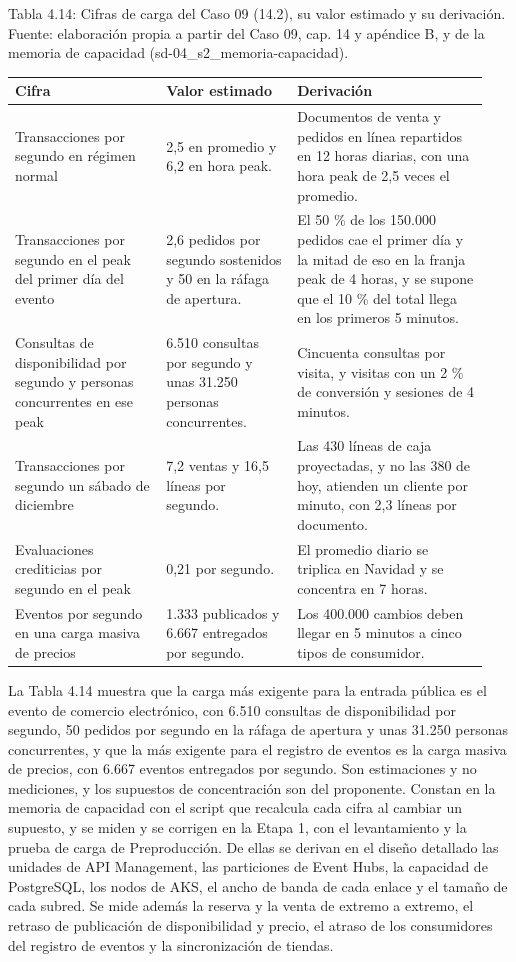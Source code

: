 \documentclass[11pt]{article}
\begin{document}
Tabla 4.14: Cifras de carga del Caso 09 (14.2), su valor estimado y su derivación. Fuente: elaboración propia a partir del Caso 09, cap. 14 y apéndice B, y de la memoria de capacidad (sd-04\_s2\_memoria-capacidad).\par\nopagebreak
\begin{longtable}{@{}p{0.30\linewidth}p{0.26\linewidth}p{0.38\linewidth}@{}}
\toprule Cifra & Valor estimado & Derivación \\
\midrule\endhead\bottomrule\endlastfoot
Transacciones por segundo en régimen normal & 2,5 en promedio y 6,2 en hora peak. & Documentos de venta y pedidos en línea repartidos en 12 horas diarias, con una hora peak de 2,5 veces el promedio. \\
Transacciones por segundo en el peak del primer día del evento & 2,6 pedidos por segundo sostenidos y 50 en la ráfaga de apertura. & El 50 \% de los 150.000 pedidos cae el primer día y la mitad de eso en la franja peak de 4 horas, y se supone que el 10 \% del total llega en los primeros 5 minutos. \\
Consultas de disponibilidad por segundo y personas concurrentes en ese peak & 6.510 consultas por segundo y unas 31.250 personas concurrentes. & Cincuenta consultas por visita, y visitas con un 2 \% de conversión y sesiones de 4 minutos. \\
Transacciones por segundo un sábado de diciembre & 7,2 ventas y 16,5 líneas por segundo. & Las 430 líneas de caja proyectadas, y no las 380 de hoy, atienden un cliente por minuto, con 2,3 líneas por documento. \\
Evaluaciones crediticias por segundo en el peak & 0,21 por segundo. & El promedio diario se triplica en Navidad y se concentra en 7 horas. \\
Eventos por segundo en una carga masiva de precios & 1.333 publicados y 6.667 entregados por segundo. & Los 400.000 cambios deben llegar en 5 minutos a cinco tipos de consumidor. \\
\end{longtable}

La Tabla 4.14 muestra que la carga más exigente para la entrada pública es el evento de comercio electrónico, con 6.510 consultas de disponibilidad por segundo, 50 pedidos por segundo en la ráfaga de apertura y unas 31.250 personas concurrentes, y que la más exigente para el registro de eventos es la carga masiva de precios, con 6.667 eventos entregados por segundo. Son estimaciones y no mediciones, y los supuestos de concentración son del proponente. Constan en la memoria de capacidad con el script que recalcula cada cifra al cambiar un supuesto, y se miden y se corrigen en la Etapa 1, con el levantamiento y la prueba de carga de Preproducción. De ellas se derivan en el diseño detallado las unidades de API Management, las particiones de Event Hubs, la capacidad de PostgreSQL, los nodos de AKS, el ancho de banda de cada enlace y el tamaño de cada subred. Se mide además la reserva y la venta de extremo a extremo, el retraso de publicación de disponibilidad y precio, el atraso de los consumidores del registro de eventos y la sincronización de tiendas.
\end{document}
